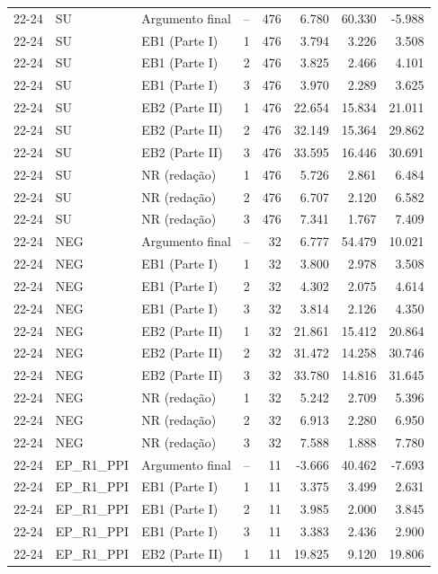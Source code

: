 \begin{longtable}{lllcrrrr}
\midrule
22-24 & SU & Argumento final & -- & 476 & 6.780 & 60.330 & -5.988 \\
22-24 & SU & EB1 (Parte I) & 1 & 476 & 3.794 & 3.226 & 3.508 \\
22-24 & SU & EB1 (Parte I) & 2 & 476 & 3.825 & 2.466 & 4.101 \\
22-24 & SU & EB1 (Parte I) & 3 & 476 & 3.970 & 2.289 & 3.625 \\
22-24 & SU & EB2 (Parte II) & 1 & 476 & 22.654 & 15.834 & 21.011 \\
22-24 & SU & EB2 (Parte II) & 2 & 476 & 32.149 & 15.364 & 29.862 \\
22-24 & SU & EB2 (Parte II) & 3 & 476 & 33.595 & 16.446 & 30.691 \\
22-24 & SU & NR (redação) & 1 & 476 & 5.726 & 2.861 & 6.484 \\
22-24 & SU & NR (redação) & 2 & 476 & 6.707 & 2.120 & 6.582 \\
22-24 & SU & NR (redação) & 3 & 476 & 7.341 & 1.767 & 7.409 \\
22-24 & NEG & Argumento final & -- & 32 & 6.777 & 54.479 & 10.021 \\
22-24 & NEG & EB1 (Parte I) & 1 & 32 & 3.800 & 2.978 & 3.508 \\
22-24 & NEG & EB1 (Parte I) & 2 & 32 & 4.302 & 2.075 & 4.614 \\
22-24 & NEG & EB1 (Parte I) & 3 & 32 & 3.814 & 2.126 & 4.350 \\
22-24 & NEG & EB2 (Parte II) & 1 & 32 & 21.861 & 15.412 & 20.864 \\
22-24 & NEG & EB2 (Parte II) & 2 & 32 & 31.472 & 14.258 & 30.746 \\
22-24 & NEG & EB2 (Parte II) & 3 & 32 & 33.780 & 14.816 & 31.645 \\
22-24 & NEG & NR (redação) & 1 & 32 & 5.242 & 2.709 & 5.396 \\
22-24 & NEG & NR (redação) & 2 & 32 & 6.913 & 2.280 & 6.950 \\
22-24 & NEG & NR (redação) & 3 & 32 & 7.588 & 1.888 & 7.780 \\
22-24 & EP\_R1\_PPI & Argumento final & -- & 11 & -3.666 & 40.462 & -7.693 \\
22-24 & EP\_R1\_PPI & EB1 (Parte I) & 1 & 11 & 3.375 & 3.499 & 2.631 \\
22-24 & EP\_R1\_PPI & EB1 (Parte I) & 2 & 11 & 3.985 & 2.000 & 3.845 \\
22-24 & EP\_R1\_PPI & EB1 (Parte I) & 3 & 11 & 3.383 & 2.436 & 2.900 \\
22-24 & EP\_R1\_PPI & EB2 (Parte II) & 1 & 11 & 19.825 & 9.120 & 19.806 \\

\end{longtable}
